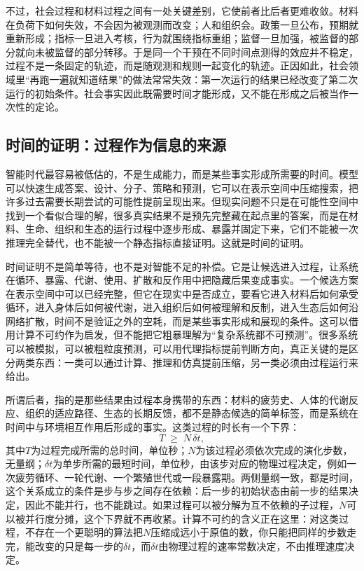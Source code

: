 不过，社会过程和材料过程之间有一处关键差别，它使前者比后者更难收敛。材料在负荷下如何失效，不会因为被观测而改变；人和组织会。政策一旦公布，预期就重新形成；指标一旦进入考核，行为就围绕指标重组；监督一旦加强，被监督的部分就向未被监督的部分转移。于是同一个干预在不同时间点测得的效应并不稳定，过程不是一条固定的轨迹，而是随观测和规则一起变化的轨迹。正因如此，社会领域里“再跑一遍就知道结果”的做法常常失效：第一次运行的结果已经改变了第二次运行的初始条件。社会事实因此既需要时间才能形成，又不能在形成之后被当作一次性的定论。

\subsection{时间的证明：过程作为信息的来源}

智能时代最容易被低估的，不是生成能力，而是某些事实形成所需要的时间。模型可以快速生成答案、设计、分子、策略和预测，它可以在表示空间中压缩搜索，把许多过去需要长期尝试的可能性提前呈现出来。但现实问题不只是在可能性空间中找到一个看似合理的解，很多真实结果不是预先完整藏在起点里的答案，而是在材料、生命、组织和生态的运行过程中逐步形成、暴露并固定下来，它们不能被一次推理完全替代，也不能被一个静态指标直接证明。这就是时间的证明。


时间证明不是简单等待，也不是对智能不足的补偿。它是让候选进入过程，让系统在循环、暴露、代谢、使用、扩散和反作用中把隐藏后果变成事实。一个候选方案在表示空间中可以已经完整，但它在现实中是否成立，要看它进入材料后如何承受循环，进入身体后如何被代谢，进入组织后如何被理解和反制，进入生态后如何沿网络扩散，时间不是验证之外的空耗，而是某些事实形成和展现的条件。这可以借用计算不可约作为启发，但不能把它粗暴理解为“复杂系统都不可预测”。很多系统可以被模拟，可以被粗粒度预测，可以用代理指标提前判断方向，真正关键的是区分两类东西：一类可以通过计算、推理和仿真提前压缩，另一类必须由过程运行来给出。

所谓后者，指的是那些结果由过程本身携带的东西：材料的疲劳史、人体的代谢反应、组织的适应路径、生态的长期反馈，都不是静态候选的简单标签，而是系统在时间中与环境相互作用后形成的事实。这类过程的时长有一个下界：
\begin{equation}
T\;\ge\;N\,\delta t,
\label{eq:steps}
\end{equation}
其中$T$为过程完成所需的总时间，单位秒；$N$为该过程必须依次完成的演化步数，无量纲；$\delta t$为单步所需的最短时间，单位秒，由该步对应的物理过程决定，例如一次疲劳循环、一轮代谢、一个繁殖世代或一段暴露期。两侧量纲一致，都是时间，这个关系成立的条件是步与步之间存在依赖：后一步的初始状态由前一步的结果决定，因此不能并行，也不能跳过。如果过程可以被分解为互不依赖的子过程，$N$可以被并行度分摊，这个下界就不再收紧。计算不可约的含义正在这里：对这类过程，不存在一个更聪明的算法把$N$压缩成远小于原值的数，你只能把同样的步数走完，能改变的只是每一步的$\delta t$，而$\delta t$由物理过程的速率常数决定，不由推理速度决定。

